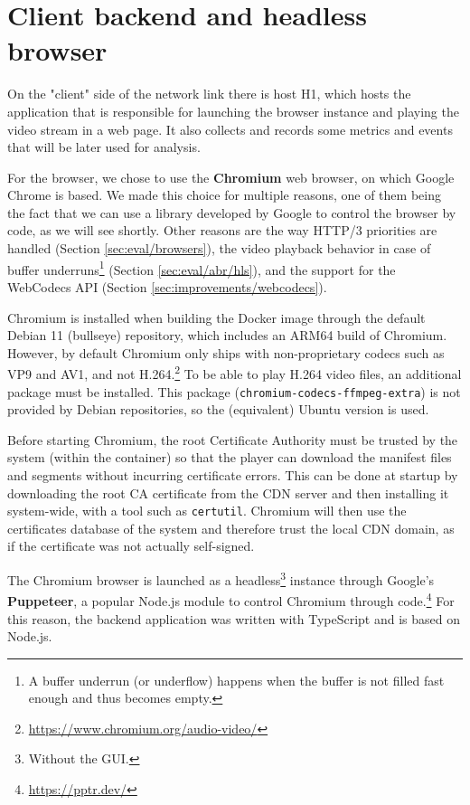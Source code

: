 \section{Client backend and headless browser}
\label{sec:testbed/backend}

On the "client" side of the network link there is host H1, which hosts the application that is responsible for launching the browser instance and playing the video stream in a web page. It also collects and records some metrics and events that will be later used for analysis.

For the browser, we chose to use the \textbf{Chromium} web browser, on which Google Chrome is based. We made this choice for multiple reasons, one of them being the fact that we can use a library developed by Google to control the browser by code, as we will see shortly. Other reasons are the way HTTP/3 priorities are handled (Section \ref{sec:eval/browsers}), the video playback behavior in case of buffer underruns\footnote{A buffer underrun (or underflow) happens when the buffer is not filled fast enough and thus becomes empty.} (Section \ref{sec:eval/abr/hls}), and the support for the WebCodecs API (Section \ref{sec:improvements/webcodecs}).

Chromium is installed when building the Docker image through the default Debian 11 (bullseye) repository, which includes an ARM64 build of Chromium. However, by default Chromium only ships with non-proprietary codecs such as VP9 and AV1, and not H.264.\footnote{\url{https://www.chromium.org/audio-video/}} To be able to play H.264 video files, an additional package must be installed. This package (\texttt{chromium-codecs-ffmpeg-extra}) is not provided by Debian repositories, so the (equivalent) Ubuntu version is used.

Before starting Chromium, the root Certificate Authority must be trusted by the system (within the container) so that the player can download the manifest files and segments without incurring certificate errors. This can be done at startup by downloading the root CA certificate from the CDN server and then installing it system-wide, with a tool such as \texttt{certutil}. Chromium will then use the certificates database of the system and therefore trust the local CDN domain, as if the certificate was not actually self-signed.

The Chromium browser is launched as a headless\footnote{Without the GUI.} instance through Google's \textbf{Puppeteer}, a popular Node.js module to control Chromium through code.\footnote{\url{https://pptr.dev/}} For this reason, the backend application was written with TypeScript and is based on Node.js.

